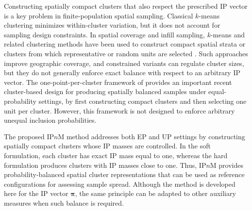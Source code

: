 \documentclass[12pt]{imsart}
\theoremstyle{plain}
\theoremstyle{remark}
\begin{document}
Constructing spatially compact clusters that also respect the prescribed
IP vector is a key problem in finite-population
spatial sampling. Classical \(k\)-means clustering \citep{lloyd1982least} minimizes
within-cluster variation, but it does not account for sampling design
constraints. In spatial coverage and infill sampling, \(k\)-means and related
clustering methods have been used to construct compact spatial strata or
clusters from which representative or random units are selected
\citep{brus2007designing,benedetti2017alternative,brus2022spatial}. Such
approaches improve geographic coverage, and constrained variants
\citep{modha2003feature} can regulate cluster sizes, but they do not generally
enforce exact balance with respect to an arbitrary IP vector. The
one-point-per-cluster framework of \citet{robertson2024onepoint} provides an
important recent cluster-based design for producing spatially balanced samples
under equal-probability settings, by first constructing compact clusters and
then selecting one unit per cluster. However, this framework is not designed
to enforce arbitrary unequal inclusion probabilities.

The proposed IP\(n\)M method addresses both EP and UP settings by constructing
spatially compact clusters whose IP masses are controlled. In the soft
formulation, each cluster has exact IP mass equal to one, whereas the hard
formulation produces clusters with IP masses close to one. Thus, IP\(n\)M provides probability-balanced spatial cluster representations
that can be used as reference configurations for assessing sample spread. Although the method is developed
here for the IP vector \(\bm\pi\), the same principle can be adapted to other
auxiliary measures when such balance is required.
\end{document}
